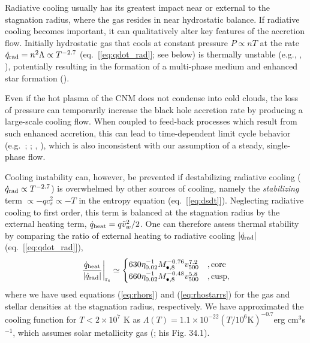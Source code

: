 \documentclass[usenatbib,fleqn]{mn2e}
\begin{document}
Radiative cooling usually has its greatest impact near or external to
the stagnation radius, where the gas resides in near hydrostatic
balance.  If radiative cooling becomes important, it can qualitatively
alter key features of the accretion flow. Initially hydrostatic gas
that cools at constant pressure $P \propto nT$ at the rate
$\dot{q}_{\rm rad} = n^{2}\Lambda \propto T^{-2.7}$
(eq.~[\ref{eq:qdot_rad}]; see below) is thermally unstable (e.g.,
\citealt{McCourt+12}, \citealt{Li&Bryan14a}), potentially resulting in
the formation of a multi-phase medium and enhanced star formation
(\citealt{Li&Bryan14b}).  

Even if the hot plasma of the CNM does not condense into cold clouds,
the loss of pressure can temporarily increase the black hole accretion
rate by producing a large-scale cooling flow.  When coupled to
feed-back processes which result from such enhanced accretion, this
can lead to time-dependent limit cycle behavior
(e.g.~\citealt{Ciotti&Ostriker07}; \citealt{Ciotti+10};
\citealt{Yuan&Li11}, \citealt{Gan+14}), which is also inconsistent
with our assumption of a steady, single-phase flow.

Cooling instability can, however, be prevented if destabilizing
radiative cooling ($\dot{q}_{\rm rad} \propto T^{-2.7}$) is
overwhelmed by other sources of cooling, namely the {\it stabilizing}
term $\propto -q c_{s}^{2} \propto -T$ in the entropy equation
(eq.~[\ref{eq:dsdt}]).  Neglecting radiative cooling to first order,
this term is balanced at the stagnation radius by the external heating
term, $\dot{q}_{\rm heat} = q \tilde{v}_{w}^{2}/2$.  One can therefore assess thermal
stability by comparing the ratio of
external heating to radiative cooling $|\dot{q}_{\rm rad}|$
(eq.~[\ref{eq:qdot_rad}]),
\begin{align}
\left.\frac{\dot{q}_{\rm heat}}{|\dot{q}_{\rm rad}|}\right|_{\rm r_{\rm s}} \simeq
  \begin{cases}
   630 \eta_{0.02}^{-1} M_{\bullet,8}^{-0.76}v_{500}^{7.2}  &, \text{core}\\
   660 \eta_{0.02}^{-1} M_{\bullet,8}^{-0.48}v_{500}^{5.8}  &, \text{cusp},     
  \end{cases}
  \label{eq:cooling2}
\end{align}
where we have used equations (\ref{eq:rhors}) and (\ref{eq:rhostarrs})
for the gas and stellar densities at the stagnation radius,
respectively.  We have approximated the cooling function for $T <
2\times 10^{7}$ K as $\Lambda(T) = 1.1 \times 10^{-22} \left(T/10^6
  \text{K}\right)^{-0.7} $erg cm$^3 $s$^{-1}$, which assumes solar
metallicity gas (\citealt{Draine:2011a}; his Fig. 34.1).  
\end{document}
